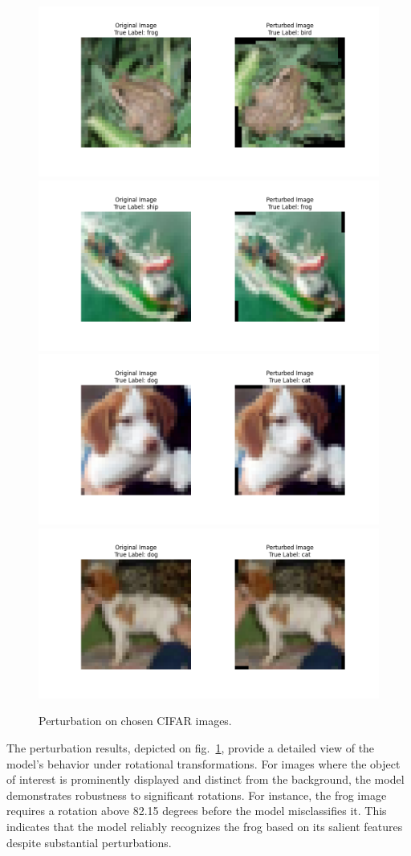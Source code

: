 \documentclass[journal, a4paper]{IEEEtran}
\begin{document}
\begin{figure}[ht]\centering
    \includegraphics[width=.6\linewidth]{img/counterfacts/CIFAR/img_2}
    \includegraphics[width=.6\linewidth]{img/counterfacts/CIFAR/img_7}
    \includegraphics[width=.6\linewidth]{img/counterfacts/CIFAR/img_8}
    \includegraphics[width=.6\linewidth]{img/counterfacts/CIFAR/img_6}
    \caption{Perturbation on chosen CIFAR images.}\label{fig:cifar-cnn-peturbation}
\end{figure}

The perturbation results, depicted on fig.~\ref{fig:cifar-cnn-peturbation}, provide a detailed view of the model's behavior under rotational transformations.
For images where the object of interest is prominently displayed and distinct from the background, the model demonstrates robustness to significant rotations.
For instance, the frog image requires a rotation above 82.15 degrees before the model misclassifies it.
This indicates that the model reliably recognizes the frog based on its salient features despite substantial perturbations.
\end{document}
